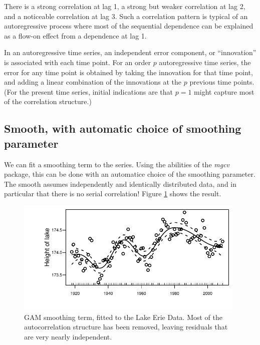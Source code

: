 There is a strong correlation at lag 1, a strong but weaker
correlation at lag 2, and a noticeable correlation at lag 3.  Such a
correlation pattern is typical of an autoregressive process where
most of the sequential dependence can be explained as a flow-on
effect from a dependence at lag 1.

In an autoregressive time series, an  independent error component, or ``innovation'' is
associated with each time point. For an order $p$ autoregressive time
series, the error for any time point is obtained by taking the
innovation for that time point, and adding a linear combination of the
innovations at the $p$ previous time points.  (For the present time
series, initial indications are that $p=1$ might capture most of the
correlation structure.)

\subsection*{Smooth, with automatic choice of smoothing parameter}

We can fit a smoothing term to the  series.  Using the
abilities of the {\em mgcv} package, this can be done with an
automatice choice of the smoothing parameter.  The smooth
assumes  independently and
identically distributed data, and in particular that there is no
serial correlation!  Figure \ref{lh-smoothplot} shows the result.

\begin{figure}
\begin{Schunk}


\centerline{\includegraphics[width=0.98\textwidth]{figs/12-gamErie-1} }

\end{Schunk}
\caption{GAM smoothing term, fitted to the Lake Erie Data.
    Most of the autocorrelation structure has been
    removed, leaving residuals that are very nearly independent.
  }\label{lh-smoothplot}
\end{figure}


